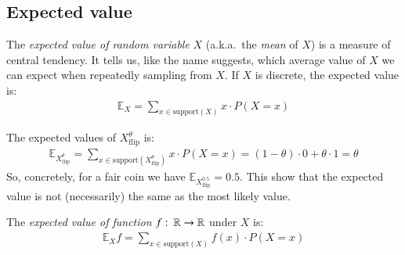 \documentclass[nobib,nofonts]{tufte-handout}
\renewcommand{\markdef}[1]{\emph{#1}}
\newcommand{\mult}{\ensuremath{\cdot}}
\begin{document}



\subsection{Expected value}

The \markdef{expected value of random variable} $X$ (a.k.a.~the \emph{mean} of $X$) is a measure of central tendency.
It tells us, like the name suggests, which average value of $X$ we can expect when repeatedly sampling from $X$.
If $X$ is discrete, the expected value is:
\begin{align*}
  \mathds{E}_X = \sum_{x \in \text{support}(X)} x \mult P(X = x)
\end{align*}

\begin{example}
  The expected values of $X_{\text{flip}}^{\theta}$ is:
  \begin{align*}
    \mathds{E}_{X_{\text{flip}}^{\theta}} = \sum_{x \in \text{support}(X_{\text{flip}}^{\theta})} x \mult P(X = x) = (1- \theta) \mult 0 + \theta \mult 1 = \theta
  \end{align*}
  So, concretely, for a fair coin we have $\mathds{E}_{X_{\text{flip}}^{0.5}} = 0.5$.
  This show that the expected value is not (necessarily) the same as the most likely value.
\end{example}

The \markdef{expected value of function} $f \thinspace \colon \thinspace \mathbb{R} \rightarrow \mathbb{R}$ under $X$ is:
\begin{align*}
  \mathds{E}_X f = \sum_{x \in \text{support}(X)} f(x) \mult P(X = x)
\end{align*}
\end{document}
